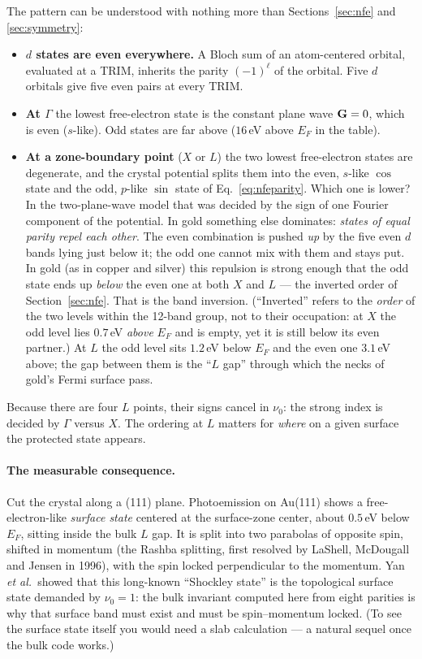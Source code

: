 The pattern can be understood with nothing more than
Sections~\ref{sec:nfe} and \ref{sec:symmetry}:
\begin{itemize}[leftmargin=2em]
\item \textbf{$d$ states are even everywhere.} A Bloch sum of an
atom-centered orbital, evaluated at a TRIM, inherits the parity
$(-1)^\ell$ of the orbital. Five $d$ orbitals give five even pairs at
every TRIM.
\item \textbf{At $\Gamma$} the lowest free-electron state is the constant
plane wave $\mathbf{G} = 0$, which is even ($s$-like). Odd states are far above
($16$\,eV above $E_F$ in the table).
\item \textbf{At a zone-boundary point} ($X$ or $L$) the two lowest
free-electron states are degenerate, and the crystal potential splits them
into the even, $s$-like $\cos$ state and the odd, $p$-like $\sin$ state
of Eq.~\eqref{eq:nfeparity}. Which one is lower? In the two-plane-wave
model that was decided by the sign of one Fourier component of the
potential. In gold something else dominates: \emph{states of equal parity
repel each other}. The even combination is pushed \emph{up} by the five
even $d$ bands lying just below it; the odd one cannot mix with them and
stays put. In gold (as in copper and silver) this repulsion is strong
enough that the odd state ends up \emph{below} the even one at both $X$
and $L$ --- the inverted order of Section~\ref{sec:nfe}. That is the band
inversion. (``Inverted'' refers to the \emph{order} of the
two levels within the 12-band group, not to their occupation: at $X$
the odd level lies $0.7$\,eV \emph{above} $E_F$ and is empty, yet it is
still below its even partner.) At $L$ the odd level sits $1.2$\,eV below $E_F$ and the
even one $3.1$\,eV above; the gap between them is the ``$L$ gap''
through which the necks of gold's Fermi surface pass.
\end{itemize}
Because there are four $L$ points, their signs cancel in $\nu_0$: the
strong index is decided by $\Gamma$ versus $X$. The ordering at $L$
matters for \emph{where} on a given surface the protected state appears.

\paragraph{The measurable consequence.} Cut the crystal along a (111)
plane. Photoemission on Au(111) shows a free-electron-like \emph{surface
state} centered at the surface-zone center, about $0.5$\,eV below $E_F$,
sitting inside the bulk $L$ gap. It is split into two parabolas of
opposite spin, shifted in momentum (the Rashba splitting, first resolved
by LaShell, McDougall and Jensen in 1996), with the spin locked
perpendicular to the momentum. Yan \emph{et al.}\ showed that this
long-known ``Shockley state'' is the topological surface state demanded by
$\nu_0 = 1$: the bulk invariant computed here from eight parities is why
that surface band must exist and must be spin--momentum locked. (To see
the surface state itself you would need a slab calculation --- a natural
sequel once the bulk code works.)

